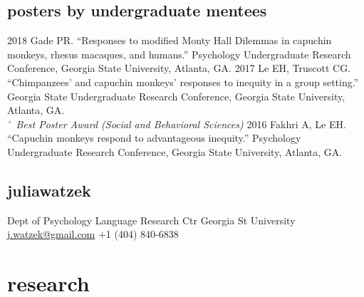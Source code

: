 \documentclass[]{friggeri-cv}
\begin{document}

\subsection{posters by undergraduate mentees}

\begin{entrylist2}
  \entrytwo
    {2018}
    {Gade PR. ``Responses to modified Monty Hall Dilemmas in capuchin monkeys, rhesus macaques, and humans.'' Psychology Undergraduate Research Conference, Georgia State University, Atlanta, GA.}
  \entrytwo
    {2017}
    {Le EH, Truscott CG. ``Chimpanzees' and capuchin monkeys' responses to inequity in a group setting.'' Georgia State Undergraduate Research Conference, Georgia State University, Atlanta, GA.\\
    {\quad\small{} $\color{lightgray} {}^\star$ \emph{\color{lightgray} Best Poster Award (Social and Behavioral Sciences)}}}
  \entrytwo
    {2016}
    {Fakhri A, Le EH. ``Capuchin monkeys respond to advantageous inequity.'' Psychology Undergraduate Research Conference, Georgia State University, Atlanta, GA.}
\end{entrylist2}



\begin{aside}
  \section{{\normalfont julia}watzek}
    Dept of Psychology
    Language Research Ctr
    Georgia St University
    ~
    \href{mailto:j.watzek@gmail.com}{j.watzek@gmail.com}
    +1 (404) 840-6838
\end{aside}


\section{research}
\end{document}
